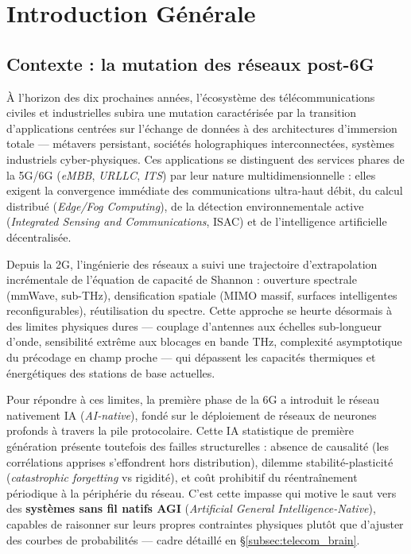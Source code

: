 \documentclass[12pt,a4paper,titlepage]{article}
\begin{document}
\newpage
\tableofcontents
\newpage

\section{Introduction Générale}

\subsection{Contexte : la mutation des réseaux post-6G}

À l'horizon des dix prochaines années, l'écosystème des télécommunications civiles et industrielles subira une mutation caractérisée par la transition d'applications centrées sur l'échange de données à des architectures d'immersion totale --- métavers persistant, sociétés holographiques interconnectées, systèmes industriels cyber-physiques. Ces applications se distinguent des services phares de la 5G/6G (\textit{eMBB}, \textit{URLLC}, \textit{ITS}) par leur nature multidimensionnelle : elles exigent la convergence immédiate des communications ultra-haut débit, du calcul distribué (\textit{Edge/Fog Computing}), de la détection environnementale active (\textit{Integrated Sensing and Communications}, ISAC) et de l'intelligence artificielle décentralisée.

Depuis la 2G, l'ingénierie des réseaux a suivi une trajectoire d'extrapolation incrémentale de l'équation de capacité de Shannon : ouverture spectrale (mmWave, sub-THz), densification spatiale (MIMO massif, surfaces intelligentes reconfigurables), réutilisation du spectre. Cette approche se heurte désormais à des limites physiques dures --- couplage d'antennes aux échelles sub-longueur d'onde, sensibilité extrême aux blocages en bande THz, complexité asymptotique du précodage en champ proche --- qui dépassent les capacités thermiques et énergétiques des stations de base actuelles.

Pour répondre à ces limites, la première phase de la 6G a introduit le réseau nativement IA (\textit{AI-native}), fondé sur le déploiement de réseaux de neurones profonds à travers la pile protocolaire. Cette IA statistique de première génération présente toutefois des failles structurelles : absence de causalité (les corrélations apprises s'effondrent hors distribution), dilemme stabilité-plasticité (\textit{catastrophic forgetting} vs rigidité), et coût prohibitif du réentraînement périodique à la périphérie du réseau. C'est cette impasse qui motive le saut vers des \textbf{systèmes sans fil natifs AGI} (\textit{Artificial General Intelligence-Native}), capables de raisonner sur leurs propres contraintes physiques plutôt que d'ajuster des courbes de probabilités --- cadre détaillé en \S\ref{subsec:telecom_brain}.
\end{document}

